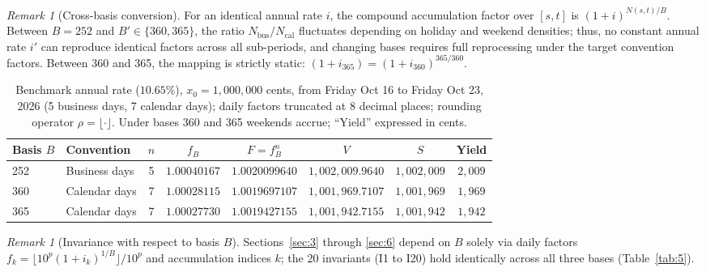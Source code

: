 \documentclass[11pt, a4paper]{article}
\theoremstyle{definition}
\theoremstyle{plain}
\theoremstyle{remark}
\newtheorem{observacao}[definicao]{Remark}
\begin{document}
\begin{observacao}[Cross-basis conversion]\label{obs:2.6}
For an identical annual rate $i$, the compound accumulation factor over $[s,t]$ is $(1 + i)^{N(s,t)/B}$. Between $B = 252$ and $B' \in \{360, 365\}$, the ratio $N_{\text{bus}}/N_{\text{cal}}$ fluctuates depending on holiday and weekend densities; thus, no constant annual rate $i'$ can reproduce identical factors across all sub-periods, and changing bases requires full reprocessing under the target convention factors. Between 360 and 365, the mapping is strictly static: $(1 + i_{365}) = (1 + i_{360})^{365/360}$.
\end{observacao}

\begin{table}[htbp]
\centering
\small
\begin{tabular}{@{}llcccccc@{}}
\toprule
\textbf{Basis $B$} & \textbf{Convention} & $n$ & $f_B$ & $F = f_B^n$ & $V$ & $S$ & \textbf{Yield} \\
\midrule
252 & Business days & 5 & $1.00040167$ & $1.0020099640$ & $1,002,009.9640$ & $1,002,009$ & $2,009$ \\
360 & Calendar days & 7 & $1.00028115$ & $1.0019697107$ & $1,001,969.7107$ & $1,001,969$ & $1,969$ \\
365 & Calendar days & 7 & $1.00027730$ & $1.0019427155$ & $1,001,942.7155$ & $1,001,942$ & $1,942$ \\
\bottomrule
\end{tabular}
\caption{Benchmark annual rate ($10.65\%$), $x_0 = 1,000,000$ cents, from Friday Oct 16 to Friday Oct 23, 2026 (5 business days, 7 calendar days); daily factors truncated at 8 decimal places; rounding operator $\rho = \lfloor \cdot \rfloor$. Under bases 360 and 365 weekends accrue; ``Yield'' expressed in cents.}
\label{tab:1}
\end{table}

\begin{observacao}[Invariance with respect to basis $B$]\label{obs:2.7}
Sections~\ref{sec:3} through \ref{sec:6} depend on $B$ solely via daily factors $f_k = \lfloor 10^p(1 + i_k)^{1/B}\rfloor / 10^p$ and accumulation indices $k$; the 20 invariants (I1 to I20) hold identically across all three bases (Table~\ref{tab:5}).
\end{observacao}
\end{document}
